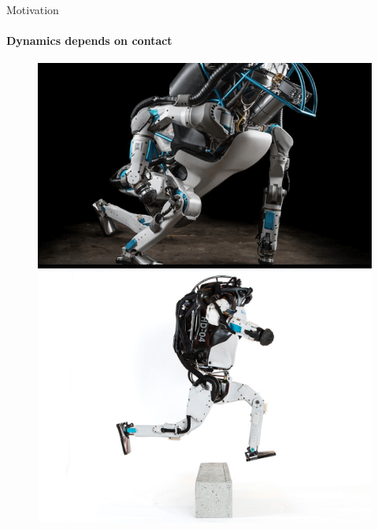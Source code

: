 \documentclass{beamer}
\begin{document}
\begin{frame}{Motivation}
\framesubtitle{Dynamics depends on contact}
\begin{flushleft}

\begin{figure}
  \includegraphics[width=\linewidth]{Atlas-Bot.png}
\endminipage\hfill
{}
  \includegraphics[width=\linewidth]{atlas in the air.jpeg}
\endminipage\hfill
{}%

\end{figure}
\end{flushleft}
\end{frame}
\end{document}
